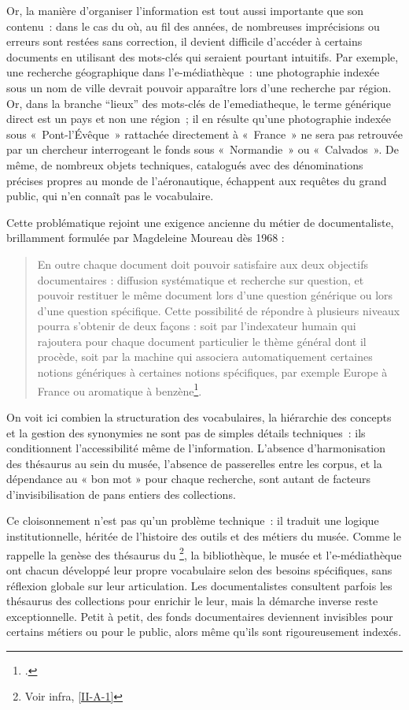 Or, la manière d'organiser l'information est tout aussi importante que son contenu : dans le cas du \mae où, au fil des années, de nombreuses imprécisions ou erreurs sont restées sans correction, il devient difficile d'accéder à certains documents en utilisant des mots-clés qui seraient pourtant intuitifs. Par exemple, une recherche géographique dans l’e-médiathèque : une photographie indexée sous un nom de ville devrait pouvoir apparaître lors d'une recherche par région. Or, dans la branche \enquote{lieux} des mots-clés de l'\gls{emediatheque}, le terme générique direct est un pays et non une région ; il en résulte qu’une photographie indexée sous « Pont-l’Évêque » rattachée directement à « France » ne sera pas retrouvée par un chercheur interrogeant le fonds sous « Normandie » ou « Calvados ». De même, de nombreux objets techniques, catalogués avec des dénominations précises propres au monde de l’aéronautique, échappent aux requêtes du grand public, qui n’en connaît pas le vocabulaire.

Cette problématique rejoint une exigence ancienne du métier de documentaliste, brillamment formulée par Magdeleine Moureau dès 1968 : 
\begin{quote}
	\og En outre chaque document doit pouvoir satisfaire aux deux objectifs documentaires : diffusion systématique et recherche sur question, et pouvoir restituer le même document lors d'une question générique ou lors d'une question spécifique. Cette possibilité de répondre à plusieurs niveaux pourra s'obtenir de deux façons : soit par l'indexateur humain qui rajoutera pour chaque document particulier le thème général dont il procède, soit par la machine qui associera automatiquement certaines notions génériques à certaines notions spécifiques, par exemple Europe à France ou aromatique à benzène\footcite{moureauProblemesPosesPar1968}.\fg
\end{quote}
On voit ici combien la structuration des vocabulaires, la hiérarchie des concepts et la gestion des synonymies ne sont pas de simples détails techniques : ils conditionnent l’accessibilité même de l’information. L’absence d’harmonisation des thésaurus au sein du musée, l’absence de passerelles entre les corpus, et la dépendance au « bon mot » pour chaque recherche, sont autant de facteurs d’invisibilisation de pans entiers des collections.

Ce cloisonnement n’est pas qu’un problème technique : il traduit une logique institutionnelle, héritée de l’histoire des outils et des métiers du musée. Comme le rappelle la genèse des thésaurus du \mae\footnote{Voir infra, \ref{II-A-1}}, la bibliothèque, le musée et l’e-médiathèque ont chacun développé leur propre vocabulaire selon des besoins spécifiques, sans réflexion globale sur leur articulation. Les documentalistes consultent parfois les thésaurus des collections pour enrichir le leur, mais la démarche inverse reste exceptionnelle. Petit à petit, des fonds documentaires deviennent invisibles pour certains métiers ou pour le public, alors même qu’ils sont rigoureusement indexés.

